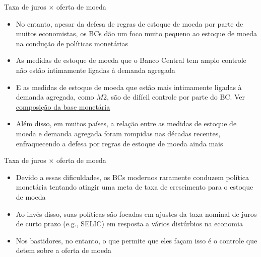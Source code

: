 \documentclass[10pt]{beamer}
\begin{document}
\begin{frame}{Taxa de juros $\times$ oferta de moeda}
    \begin{itemize}
        \item No entanto, apesar da defesa de regras de estoque de moeda por parte de muitos economistas, os BCs dão um foco muito pequeno ao estoque de moeda na condução de políticas monetárias
        \bigskip
        \item As medidas de estoque de moeda que o Banco Central tem amplo controle não estão intimamente ligadas à demanda agregada
        \bigskip
        \item E as medidas de estoque de moeda que estão mais intimamente ligadas à demanda agregada, como $M2$, são de difícil controle por parte do BC. Ver \href{https://pt.wikipedia.org/wiki/Base_monet\%C3\%A1ria}{composição da base monetária}
        \bigskip
        \item Além disso, em muitos países, a relação entre as medidas de estoque de moeda e demanda agregada foram rompidas nas décadas recentes, enfraquecendo a defesa por regras de estoque de moeda ainda mais
    \end{itemize}
\end{frame}

\begin{frame}{Taxa de juros $\times$ oferta de moeda}
    \begin{itemize}
        \item Devido a essas dificuldades, os BCs modernos raramente conduzem política monetária tentando atingir uma meta de taxa de crescimento para o estoque de moeda
        \bigskip
        \item Ao invés disso, suas políticas são focadas em ajustes da taxa nominal de juros de curto prazo (e.g., SELIC) em resposta a vários distúrbios na economia
        \bigskip
        \item Nos bastidores, no entanto, o que permite que eles façam isso é o controle que detem sobre a oferta de moeda
    \end{itemize}
\end{frame}
\end{document}
